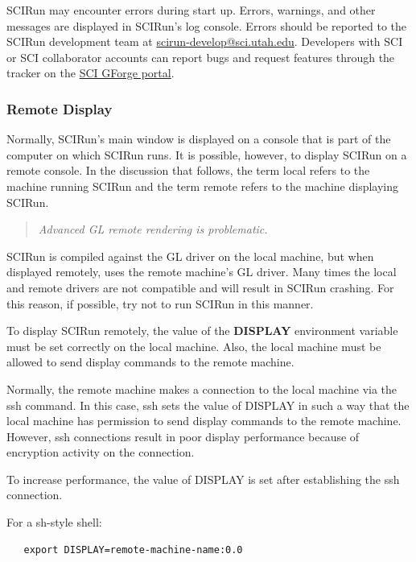 \documentclass[fleqn,12pt,openany]{book}
\begin{document}
SCIRun may encounter errors during start up.
Errors, warnings, and other messages are displayed in SCIRun's log console.
Errors should be reported to the SCIRun development team at
\href{mailto:scirun-develop@sci.utah.edu}{scirun-develop@sci.utah.edu}.
Developers with SCI or SCI collaborator accounts can report bugs and request features through the
tracker on the \href{https://gforge.sci.utah.edu/gf/project/cibc/tracker}{SCI GForge portal}. 

\subsubsection{Remote Display}
Normally, SCIRun's main window is displayed on a console that is part of the computer on which SCIRun runs.
It is possible, however, to display SCIRun on a remote console.
In the discussion that follows, the term local refers to the machine running SCIRun and the term remote refers to the machine displaying SCIRun.

\begin{quote}
\begin{centering}
\emph{Advanced GL remote rendering is problematic.}
\end{centering}
\end{quote}

SCIRun is compiled against the GL driver on the local machine, but when displayed remotely, uses the remote machine's GL driver.
Many times the local and remote drivers are not compatible and will result in SCIRun crashing.
For this reason, if possible, try not to run SCIRun in this manner.

To display SCIRun remotely, the value of the \textbf{DISPLAY} environment variable must be set correctly on the local machine.
Also, the local machine must be allowed to send display commands to the remote machine.

Normally, the remote machine makes a connection to the local machine via the ssh command.
In this case, ssh sets the value of DISPLAY in such a way that the local machine has permission to send display commands to the remote machine.
However, ssh connections result in poor display performance because of encryption activity on the connection.

To increase performance, the value of DISPLAY is set after establishing the ssh connection.

For a sh-style shell:

\begin{verbatim}
   export DISPLAY=remote-machine-name:0.0
\end{verbatim}
\end{document}
